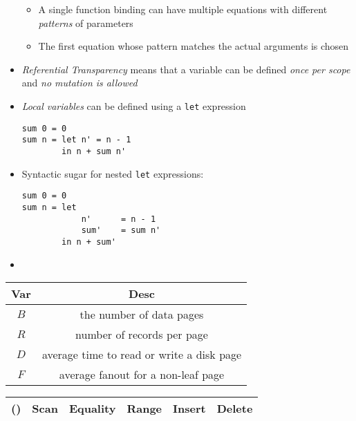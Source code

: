 \documentclass[landscape,8pt]{extarticle}
\newcommand{\code}{\lstinline}
\begin{document}
\begin{multicols}{4}
\begin{itemize}
\begin{itemize}
               \item A single function binding can have multiple equations with different \emph{patterns} of parameters
               \item The first equation whose pattern matches the actual arguments is chosen
           \end{itemize}
           \item \emph{Referential Transparency} means that a variable can be defined \emph{once per scope} and \emph{no mutation is allowed}
           \item \emph{Local variables} can be defined using a \code{let} expression
           \begin{lstlisting}
sum 0 = 0
sum n = let n' = n - 1
        in n + sum n'
           \end{lstlisting}
           \item Syntactic sugar for nested \code{let} expressions:
           \begin{lstlisting}
sum 0 = 0
sum n = let
            n'      = n - 1
            sum'    = sum n'
        in n + sum'
           \end{lstlisting}
           \item
        \end{itemize}
    \begin{center}
        \begin{tabular}{ | c | c | } \toprule
            Var     & Desc                                      \\ \midrule
            $B$     & the number of data pages                  \\ \midrule
            $R$     & number of records per page                \\ \midrule
            $D$     & average time to read or write a disk page \\ \midrule
            $F$     & average fanout for a non-leaf page        \\ \bottomrule
        \end{tabular}
    \end{center}
    \begin{center}
        \begin{adjustbox}{angle=270}
            \begin{tabular}{ | c | c | c | c | c | c | } \toprule
                ()            & Scan          & Equality              & Range                                    & Insert        & Delete        \\ \midrule

\end{tabular}
\end{adjustbox}
\end{center}
\end{multicols}
\end{document}
